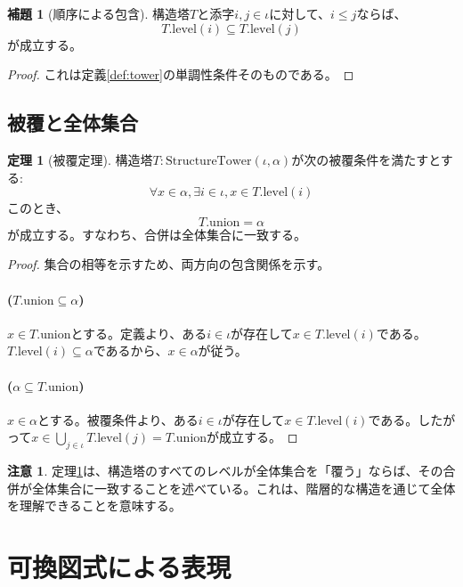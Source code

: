 \documentclass[a4paper,12pt]{article}
\theoremstyle{definition}
\newtheorem{theorem}[definition]{定理}
\newtheorem{lemma}[definition]{補題}
\newtheorem{remark}[definition]{注意}
\begin{document}
\begin{lemma}[順序による包含]\label{lem:order_subset}
構造塔$T$と添字$i, j \in \iota$に対して、$i \leq j$ならば、
\[
T.\text{level}(i) \subseteq T.\text{level}(j)
\]
が成立する。
\end{lemma}

\begin{proof}
これは定義\ref{def:tower}の単調性条件そのものである。
\end{proof}

\subsection{被覆と全体集合}

\begin{theorem}[被覆定理]\label{thm:covering}
構造塔$T : \text{StructureTower}(\iota, \alpha)$が次の被覆条件を満たすとする:
\[
\forall x \in \alpha, \exists i \in \iota, x \in T.\text{level}(i)
\]
このとき、
\[
T.\text{union} = \alpha
\]
が成立する。すなわち、合併は全体集合に一致する。
\end{theorem}

\begin{proof}
集合の相等を示すため、両方向の包含関係を示す。

\paragraph{($T.\text{union} \subseteq \alpha$)} 
$x \in T.\text{union}$とする。定義より、ある$i \in \iota$が存在して$x \in T.\text{level}(i)$である。$T.\text{level}(i) \subseteq \alpha$であるから、$x \in \alpha$が従う。

\paragraph{($\alpha \subseteq T.\text{union}$)} 
$x \in \alpha$とする。被覆条件より、ある$i \in \iota$が存在して$x \in T.\text{level}(i)$である。したがって$x \in \bigcup_{j \in \iota} T.\text{level}(j) = T.\text{union}$が成立する。
\end{proof}

\begin{remark}
定理\ref{thm:covering}は、構造塔のすべてのレベルが全体集合を「覆う」ならば、その合併が全体集合に一致することを述べている。これは、階層的な構造を通じて全体を理解できることを意味する。
\end{remark}

\section{可換図式による表現}
\end{document}
